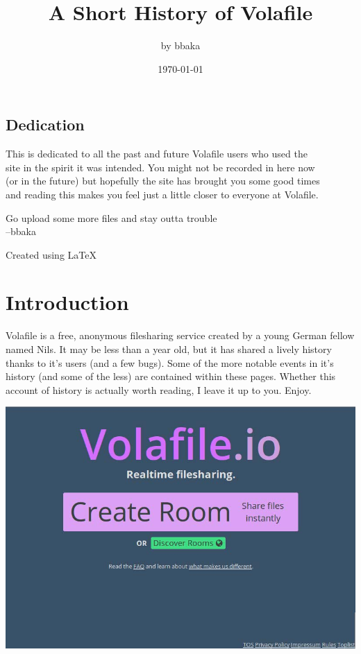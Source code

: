 \documentclass[12pt]{report}
\begin{document}
\setcounter{secnumdepth}{2}
{
    \title{A Short History of Volafile}
    \author{by bbaka\footnotemark[0]}
    \date{\today}
    \maketitle
    \tableofcontents
    \pagebreak
    \vfill

    \section*{Dedication}
    \parbox{\textwidth}{
    This is dedicated to all the past and future Volafile users who used the \\
    site in the spirit it was intended. You might not be recorded in here now \\
    (or in the future) but hopefully the site has brought you some good times \\
    and reading this makes you feel just a little closer to everyone at Volafile.\\
    \raggedright Go upload some more files and stay outta trouble \raggedleft \\--bbaka}

    \vfill

    {\centering Created using \LaTeX}

    \pagebreak

    \chapter*{Introduction}
	Volafile is a free, anonymous filesharing service created by a young German
        fellow named Nils. It may be less than a year old, but it has shared a lively
        history thanks to it's users (and a few bugs). Some of the more notable events
        in it's history (and some of the less) are contained within these pages. Whether
        this account of history is actually worth reading, I leave it up to you.
        Enjoy.

        \begin{image}
            \centering
            \includegraphics[scale=0.45]{images/Volafile.jpg}
        \end{image}

}
\end{document}
